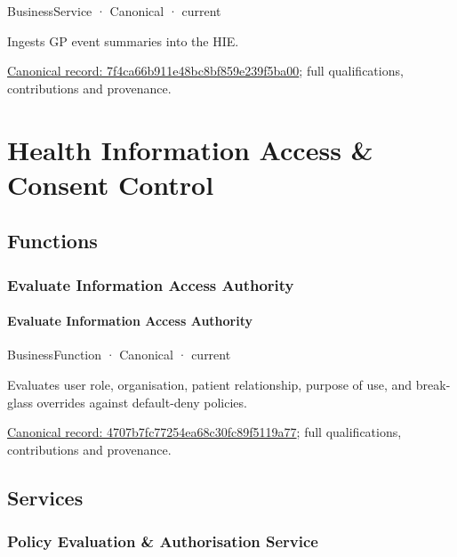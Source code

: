 \label{element:7f4ca66b911e48bc8bf859e239f5ba00}
{\small BusinessService · Canonical · current}\par

Ingests GP event summaries into the HIE.


{\footnotesize \href{../../../../continuum/business/business-service/7f4ca66b911e48bc8bf859e239f5ba00.md}{Canonical record: 7f4ca66b911e48bc8bf859e239f5ba00}; full qualifications, contributions and provenance.}\par
\section{Health Information Access \& Consent Control}

\subsection{Functions}

\subsubsection{Evaluate Information Access Authority}

\paragraph{Evaluate Information Access Authority}

\label{element:4707b7fc77254ea68c30fc89f5119a77}
{\small BusinessFunction · Canonical · current}\par

Evaluates user role, organisation, patient relationship, purpose of use, and break-glass overrides against default-deny policies.


{\footnotesize \href{../../../../continuum/business/business-function/4707b7fc77254ea68c30fc89f5119a77.md}{Canonical record: 4707b7fc77254ea68c30fc89f5119a77}; full qualifications, contributions and provenance.}\par
\subsection{Services}

\subsubsection{Policy Evaluation \& Authorisation Service}

